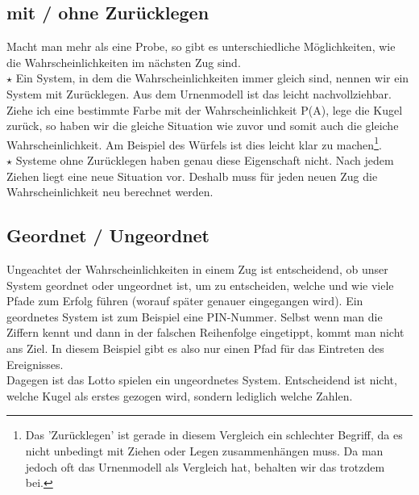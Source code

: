\subsection{mit / ohne Zurücklegen}
Macht man mehr als eine Probe, so gibt es unterschiedliche Möglichkeiten, wie die Wahrscheinlichkeiten im nächsten Zug sind.\\
\(\star\) Ein System, in dem die Wahrscheinlichkeiten immer gleich sind, nennen wir ein System mit Zurücklegen. Aus dem Urnenmodell ist das leicht nachvollziehbar. Ziehe ich eine bestimmte Farbe mit der Wahrscheinlichkeit P(A), lege die Kugel zurück, so haben wir die gleiche Situation wie zuvor und somit auch die gleiche Wahrscheinlichkeit. Am Beispiel des Würfels ist dies leicht klar zu machen\footnote{Das 'Zurücklegen' ist gerade in diesem Vergleich ein schlechter Begriff, da es nicht unbedingt mit Ziehen oder Legen zusammenhängen muss. Da man jedoch oft das Urnenmodell als Vergleich hat, behalten wir das trotzdem bei.}.\\
\(\star\) Systeme ohne Zurücklegen haben genau diese Eigenschaft nicht. Nach jedem Ziehen liegt eine neue Situation vor. Deshalb muss für jeden neuen Zug die Wahrscheinlichkeit neu berechnet werden.

\subsection{Geordnet / Ungeordnet}
Ungeachtet der Wahrscheinlichkeiten in einem Zug ist entscheidend, ob unser System geordnet oder ungeordnet ist, um zu entscheiden, welche und wie viele Pfade zum Erfolg führen (worauf später genauer eingegangen wird). Ein geordnetes System ist zum Beispiel eine PIN-Nummer. Selbst wenn man die Ziffern kennt und dann in der falschen Reihenfolge eingetippt, kommt man nicht ans Ziel. In diesem Beispiel gibt es also nur einen Pfad für das Eintreten des Ereignisses.\\
Dagegen ist das Lotto spielen ein ungeordnetes System. Entscheidend ist nicht, welche Kugel als erstes gezogen wird, sondern lediglich welche Zahlen.
